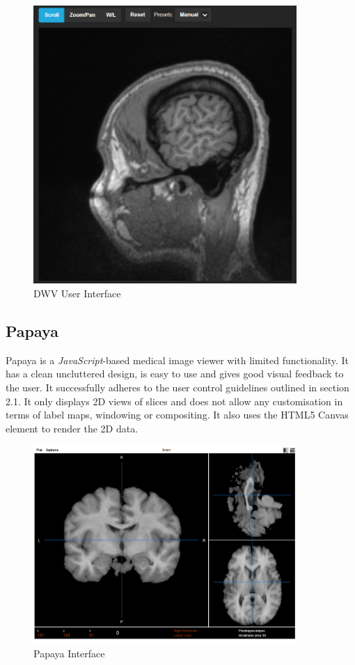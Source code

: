 \documentclass[a4paper,11pt,titlepage]{article}
\begin{document}
\begin{figure}[ht!]
\centering
\includegraphics[width=100mm]{graphics/webViewer_01.png}
\caption{DWV User Interface}
\label{fig:UIdesign1}
\end{figure}

\subsection{Papaya}
Papaya\cite{papaya} is a \textit{JavaScript}-based medical image viewer with limited functionality. It has a clean uncluttered design, is easy to use and gives good visual feedback to the user. It successfully adheres to the user control guidelines outlined in section 2.1. It only displays 2D views of slices and does not allow any customisation in terms of label maps, windowing or compositing. It also uses the HTML5 Canvas element to render the 2D data.

\begin{figure}[ht!]
\centering
\includegraphics[width=100mm]{graphics/webViewer_02.png}
\caption{Papaya Interface}
\label{fig:UIdesign1}
\end{figure}
\end{document}
